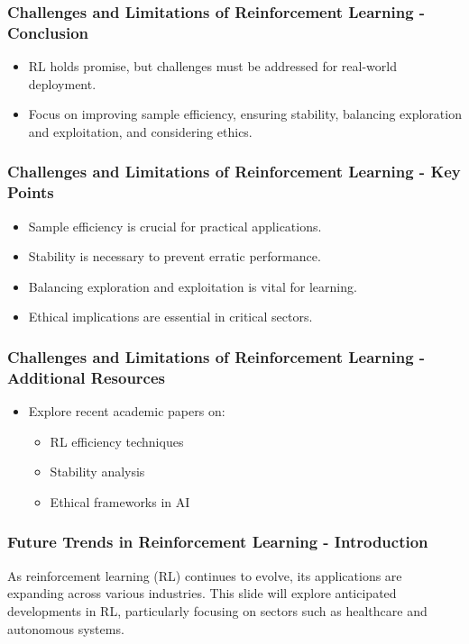 \documentclass[aspectratio=169]{beamer}
\begin{document}
\begin{frame}[fragile]
    \frametitle{Challenges and Limitations of Reinforcement Learning - Conclusion}
    \begin{itemize}
        \item RL holds promise, but challenges must be addressed for real-world deployment.
        \item Focus on improving sample efficiency, ensuring stability, balancing exploration and exploitation, and considering ethics.
    \end{itemize}
\end{frame}

\begin{frame}[fragile]
    \frametitle{Challenges and Limitations of Reinforcement Learning - Key Points}
    \begin{itemize}
        \item Sample efficiency is crucial for practical applications.
        \item Stability is necessary to prevent erratic performance.
        \item Balancing exploration and exploitation is vital for learning.
        \item Ethical implications are essential in critical sectors.
    \end{itemize}
\end{frame}

\begin{frame}[fragile]
    \frametitle{Challenges and Limitations of Reinforcement Learning - Additional Resources}
    \begin{itemize}
        \item Explore recent academic papers on:
        \begin{itemize}
            \item RL efficiency techniques
            \item Stability analysis
            \item Ethical frameworks in AI
        \end{itemize}
    \end{itemize}
\end{frame}

\begin{frame}[fragile]
    \frametitle{Future Trends in Reinforcement Learning - Introduction}
    As reinforcement learning (RL) continues to evolve, its applications are expanding across various industries. This slide will explore anticipated developments in RL, particularly focusing on sectors such as healthcare and autonomous systems.
\end{frame}
\end{document}
